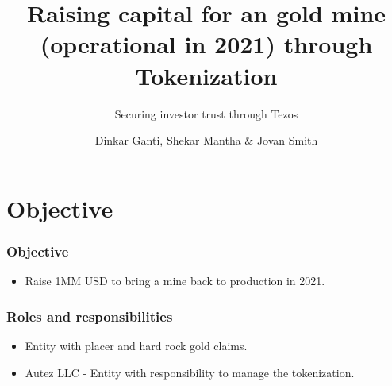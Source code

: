 \documentclass{beamer}
\title{Raising capital for an gold mine (operational in 2021) through Tokenization}
\subtitle{Securing investor trust through Tezos}
\author[Dinkar Ganti, Shekar Mantha \& Jovan Smith] {Dinkar Ganti, Shekar Mantha \& Jovan Smith}
\institute[Autez LLC]
\begin{document}
\begin{frame}
 \maketitle
\end{frame}


\section{Objective}
\begin{frame}
\frametitle{Objective}
\begin{minipage}{\textwidth}
	\begin{itemize}
    \item  Raise 1MM USD to bring a mine back to production in 2021.
  \end{itemize}

\end{minipage}
\end{frame}

\begin{frame}
\frametitle{Roles and responsibilities}
\begin{minipage}{\textwidth}
  \begin{itemize}
    \item  Entity with placer and hard rock gold claims.
    \item  Autez LLC - Entity with responsibility to manage the tokenization.
  \end{itemize}
\end{minipage}
\end{frame}
\end{document}
